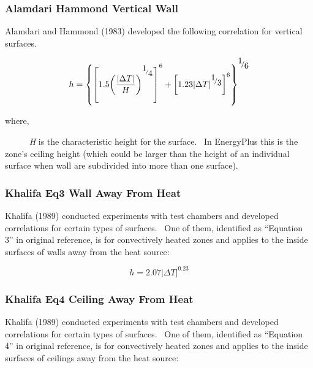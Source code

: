 \subsubsection{Alamdari Hammond Vertical Wall}\label{alamdari-hammond-vertical-wall}

Alamdari and Hammond (1983) developed the following correlation for vertical surfaces.

\begin{equation}
h = {\left\{ {{{\left[ {1.5{{\left( {\frac{{\left| {\Delta T} \right|}}{H}} \right)}^{^{{\raise0.7ex\hbox{1} \!\mathord{\left/ {\vphantom {1 4}}\right.}\!\lower0.7ex\hbox{4}}}}}} \right]}^6} + {{\left[ {1.23{{\left| {\Delta T} \right|}^{{\raise0.7ex\hbox{1} \!\mathord{\left/ {\vphantom {1 3}}\right.}\!\lower0.7ex\hbox{3}}}}} \right]}^6}} \right\}^{{\raise0.7ex\hbox{1} \!\mathord{\left/ {\vphantom {1 6}}\right.}\!\lower0.7ex\hbox{6}}}}
\end{equation}

where,

~~~~~ \emph{H} is the characteristic height for the surface.~ In EnergyPlus this is the zone's ceiling height (which could be larger than the height of an individual surface when wall are subdivided into more than one surface).

\subsubsection{Khalifa Eq3 Wall Away From Heat}\label{khalifa-eq3-wall-away-from-heat}

Khalifa (1989) conducted experiments with test chambers and developed correlations for certain types of surfaces.~ One of them, identified as ``Equation 3'' in original reference, is for convectively heated zones and applies to the inside surfaces of walls away from the heat source:

\begin{equation}
h = 2.07{\left| {\Delta T} \right|^{0.23}}
\end{equation}

\subsubsection{Khalifa Eq4 Ceiling Away From Heat}\label{khalifa-eq4-ceiling-away-from-heat}

Khalifa (1989) conducted experiments with test chambers and developed correlations for certain types of surfaces.~ One of them, identified as ``Equation 4'' in original reference, is for convectively heated zones and applies to the inside surfaces of ceilings away from the heat source:


